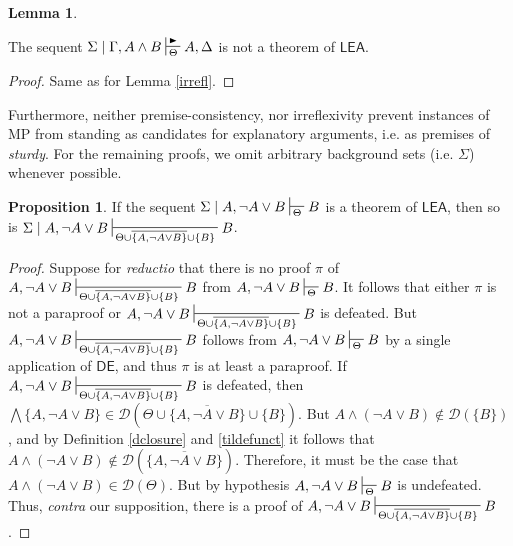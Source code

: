 \documentclass{article}
\theoremstyle{definition}
\theoremstyle{definition}
\theoremstyle{definition}
\newtheorem{lemma}{Lemma}
\theoremstyle{definition}
\theoremstyle{remark}
\theoremstyle{definition}
\newtheorem{proposition}{Proposition}
\theoremstyle{definition}
\begin{document}
\begin{lemma}\label{part_irreflex}
	
	The sequent $ \Sigma\mid \Gamma, A \wedge B \sststile{\Theta}{\RHD}  A, \Delta $ is not a theorem of $ \mathsf{LEA}$.
	
	\begin{proof}
		Same as for Lemma \ref{irrefl}.
	\end{proof}
\end{lemma}

Furthermore, neither premise-consistency, nor irreflexivity prevent instances of \textsf{MP} from standing as candidates for explanatory arguments, i.e. as premises of \textit{sturdy}. For the remaining proofs, we omit arbitrary background sets (i.e. $ \Sigma $) whenever possible.


\begin{proposition}
	If the sequent $ \Sigma\mid A, \neg A \vee B \sststile{\Theta}{}  B $ is a theorem of $ \mathsf{LEA}$, then so is $ \Sigma\mid A, \neg A \vee B \sststile{\Theta\cup\overline{\{ A, \neg A \vee B  \}}\cup\{B\}}{}  B $.
	
	\begin{proof}
		Suppose for \textit{reductio} that there is no proof $ \pi $ of $  A, \neg A \vee B \sststile{\Theta\cup\overline{\{ A, \neg A \vee B  \}}\cup\{B\}}{}  B $ from $ A, \neg A \vee B \sststile{\Theta}{}  B $. It follows that either $ \pi $ is not a paraproof or $ A, \neg A \vee B \sststile{\Theta\cup\overline{\{ A, \neg A \vee B  \}}\cup\{B\}}{}  B $ is defeated. But $  A, \neg A \vee B \sststile{\Theta\cup\overline{\{ A, \neg A \vee B  \}}\cup\{B\}}{}  B $ follows from $  A, \neg A \vee B \sststile{\Theta}{}  B $ by a single application of $ \mathsf{DE} $, and thus $ \pi $ is at least a paraproof. If $  A, \neg A \vee B \sststile{\Theta\cup\overline{\{ A, \neg A \vee B  \}}\cup\{B\}}{}  B $ is defeated, then $ \bigwedge \{A, \neg A \vee B\} \in \mathcal{D}(\Theta\cup\overline{\{ A, \neg A \vee B  \}}\cup\{B\})$. But  $ A \wedge (\neg A \vee B) \not\in \mathcal{D}(\{B\})$, and by Definition \ref{dclosure} and \ref{tildefunct} it follows that $ A \wedge (\neg A \vee B) \not\in \mathcal{D}(\overline{\{ A, \neg A \vee B  \}})$. Therefore, it must be the case that $ A \wedge (\neg A \vee B) \in\mathcal{D}(\Theta)$. But by hypothesis $  A, \neg A \vee B \sststile{\Theta}{}  B $ is undefeated. Thus, \textit{contra} our supposition, there is a proof of $ A, \neg A \vee B \sststile{\Theta\cup\overline{\{ A, \neg A \vee B  \}}\cup\{B\}}{}  B $.
	\end{proof}
\end{proposition}
\end{document}
